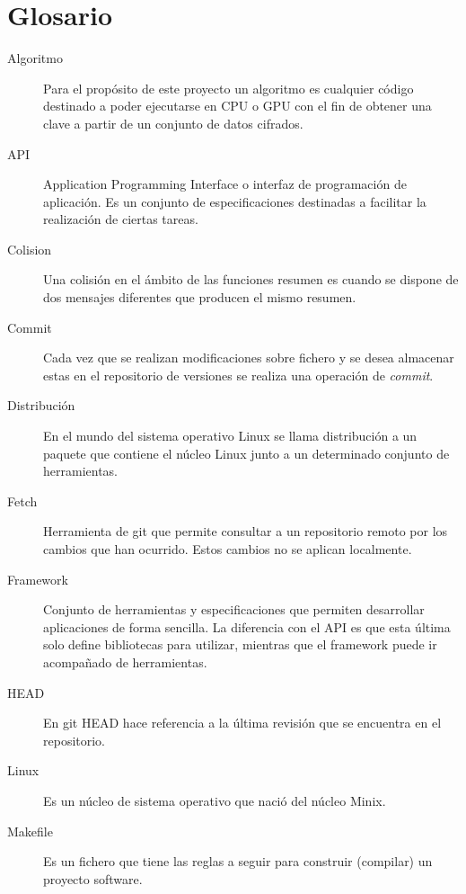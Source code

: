 \chapter{Glosario}

\begin{description}
	\item[Algoritmo] Para el propósito de este proyecto un algoritmo es cualquier código destinado a poder ejecutarse en CPU o GPU con el fin de obtener una clave a partir de un conjunto de datos cifrados.
	
	\item[API] Application Programming Interface o interfaz de programación de aplicación. Es un conjunto de especificaciones destinadas a facilitar la realización de ciertas tareas.
	
	\item[Colision] Una colisión en el ámbito de las funciones resumen es cuando se dispone de dos mensajes diferentes que producen el mismo resumen.
	
	\item[Commit] Cada vez que se realizan modificaciones sobre fichero y se desea almacenar estas en el repositorio de versiones se realiza una operación de \emph{commit}.

	\item[Distribución] En el mundo del sistema operativo Linux se llama distribución a un paquete que contiene el núcleo Linux junto a un determinado conjunto de herramientas.
	
	\item[Fetch] Herramienta de git que permite consultar a un repositorio remoto por los cambios que han ocurrido. Estos cambios no se aplican localmente.
	
	\item[Framework] Conjunto de herramientas y especificaciones que permiten desarrollar aplicaciones de forma sencilla. La diferencia con el API es que esta última solo define bibliotecas para utilizar, mientras que el framework puede ir acompañado de herramientas.
	
	\item[HEAD] En git HEAD hace referencia a la última revisión que se encuentra en el repositorio.

	\item[Linux] Es un núcleo de sistema operativo que nació del núcleo Minix.
	
	\item[Makefile] Es un fichero que tiene las reglas a seguir para construir (compilar) un proyecto software.
	

\end{description}
